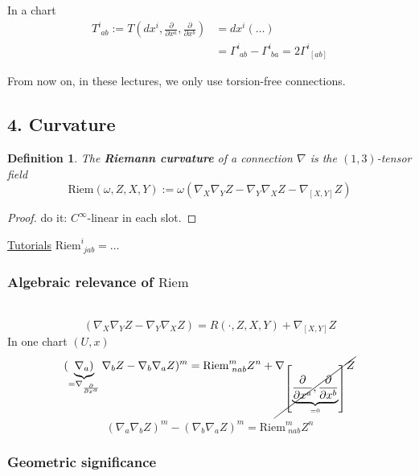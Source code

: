 \documentclass[10pt]{amsart}
\newtheorem{definition}{Definition}
\begin{document}
\begin{multicols*}{2}
	In a chart 
	\[
	\begin{aligned}
	T^i_{ \, \, ab } := T\left(dx^i , \frac{ \partial }{ \partial x^a} , \frac{ \partial }{ \partial x^b}  \right) & = dx^i ( \dots ) \\ 
	& = \Gamma^i_{ \, \, ab} - \Gamma^i_{ \, \, ba} = 2 \Gamma^i_{ \, \, [ab] }
	\end{aligned}
	\]
	
	From now on, in these lectures, we only use torsion-free connections. 
	
	\subsection*{4. Curvature}
	
	\begin{definition}
		The \textbf{Riemann curvature} of a connection $\nabla$ is the $(1,3)$-tensor field
		\begin{equation}
		\text{Riem}(\omega,Z,X,Y) := \omega( \nabla_X \nabla_Y Z - \nabla_Y \nabla_X Z - \nabla_{[X,Y]} Z)
		\end{equation}
	\end{definition}
	\begin{proof}
		do it: $C^{\infty}$-linear in each slot.  
	\end{proof}
	
	\underline{Tutorials} $\text{Riem}^i_{ \,\, jab} = \dots $
	
\subsubsection*{Algebraic relevance of $\text{Riem}$} \quad \, \\

\[
(\nabla_X \nabla_Y Z - \nabla_Y \nabla_X Z) = R(\cdot, Z,X,Y) + \nabla_{[X,Y]} Z
\]
In one chart $(U, x)$
\[
(\underbrace{\nabla_a)}_{ = \nabla_{\frac{\partial}{\partial x^a} } } \nabla_b Z - \nabla_b \nabla_a Z)^m = \text{Riem}^m_{\,\,nab} Z^n  + \cancel{ \nabla_{\left[ \underbrace{ \frac{\partial }{ \partial x^a} , \frac{\partial}{\partial x^b} }_{ = 0} \right] } Z }
\]
\[
\boxed{  (\nabla_a \nabla_b Z)^m - (\nabla_b \nabla_a Z)^m = \text{Riem}^m_{\,\, nab} Z^n }
\]

\subsubsection*{Geometric significance} \quad \, \\


\end{multicols*}
\end{document}
